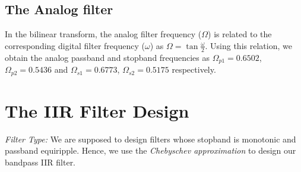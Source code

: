 \documentclass{article}
\begin{document}
\subsection{The Analog filter}
In the bilinear transform, the analog filter frequency ($\Omega$) is related to the corresponding digital filter frequency ($\omega$) as $\Omega = \tan \frac{\omega}{2}$.  Using this relation, we obtain the analog passband and stopband frequencies as $\Omega_{p1} = 0.6502$, $\Omega_{p2} = 0.5436$ and $\Omega_{s1} = 0.6773$, $\Omega_{s2} = 0.5175$ respectively.
\section{The IIR Filter Design}
{\em Filter Type:}  We are supposed to design filters whose stopband is monotonic and passband equiripple.  
Hence, we use the {\em Chebyschev approximation} to design our bandpass IIR filter.
\end{document}

